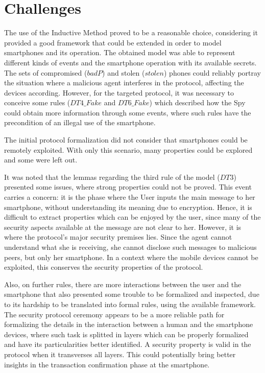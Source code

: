 \section{Challenges}
The use of the Inductive Method proved to be a reasonable choice, considering it provided a good framework that could be extended in order to model smartphones and its operation. The obtained model was able to represent different kinds of events and the smartphone operation with its available secrets. The sets of compromised ($badP$) and stolen ($stolen$) phones could reliably portray the situation where a malicious agent interferes in the protocol, affecting the devices according. However, for the targeted protocol, it was necessary to conceive some rules ($DT4\_Fake$ and $DT6\_Fake$) which described how the Spy could obtain more information through some events, where such rules have the precondition of an illegal use of the smartphone.

The initial protocol formalization did not consider that smartphones could be remotely exploited. With only this scenario, many properties could be explored and some were left out.

It was noted that the lemmas regarding the third rule of the model ($DT3$) presented some issues, where strong properties could not be proved. This event carries a concern: it is the phase where the User inputs the main message to her smartphone, without understanding its meaning due to encryption. Hence, it is difficult to extract properties which can be enjoyed by the user, since many of the security aspects available at the message are not clear to her. However, it is where the protocol's major security premises lies. Since the agent cannot understand what she is receiving, she cannot disclose such messages to malicious peers, but only her smartphone. In a context where the mobile devices cannot be exploited, this conserves the security properties of the protocol.

Also, on further rules, there are more interactions between the user and the smartphone that also presented some trouble to be formalized and inspected, due to its hardship to be translated into formal rules, using the available framework. The security protocol ceremony \cite{Ellison07} appears to be a more reliable path for formalizing the details in the interaction between a human and the smartphone devices, where such task is splitted in layers which can be properly formalized and have its particularities better identified. A security property is valid in the protocol when it transverses all layers. This could potentially bring better insights in the transaction confirmation phase at the smartphone.


